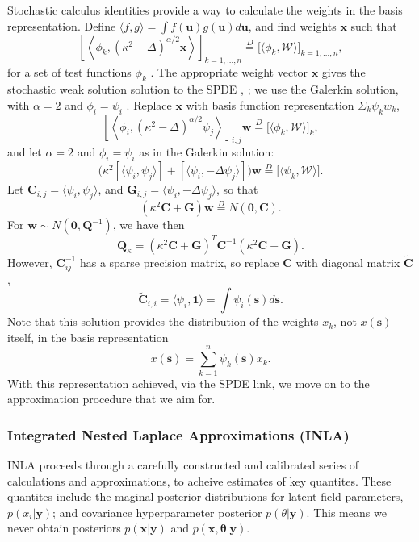 Stochastic calculus identities provide a way to calculate the weights in the basis representation. Define $\langle f, g \rangle = \int f(\pmb{u}) g(\pmb{u}) d\pmb{u}$, and find weights $\pmb{x}$ such that
$$ \left[ \left< \phi_{k}, (\kappa^{2} - \Delta)^{\alpha/2} \pmb{x} \right> \right]_{k = 1, \hdots, n} \overset{D}{=} \Big[ \langle \phi_{k}, \mathcal{W} \rangle \Big]_{k = 1, \hdots, n},$$
for a set of test functions $\phi_{k}$ \citep{Lindgren2011}. The appropriate weight vector $\pmb{x}$ gives the stochastic weak solution solution to the SPDE \citep{Mao2007}, \cite{Lindstrom2014}; we use the Galerkin solution, with $\alpha = 2$ and $\phi_{i} = \psi_{i}$ \citep{Lindgren2011}. Replace $\pmb{x}$ with basis function representation $\Sigma_{k}\psi_{k}w_{k}$,
$$ \left[ \left< \phi_{i}, (\kappa^{2} - \Delta)^{\alpha/2} \psi_{j} \right> \right]_{i,j}\pmb{w} \overset{D}{=} \Big[ \langle \phi_{k}, \mathcal{W} \rangle \Big]_{k}, $$
and let $\alpha = 2$ and $\phi_{i} = \psi_{i}$ as in the Galerkin solution:
$$ \Big(
\kappa^{2} [ \langle \psi_{i}, \psi_{j} \rangle ] + [ \langle \psi_{i}, -\Delta \psi_{j} \rangle ]
\Big) \pmb{w} \overset{D}{=} \Big[ \langle \psi_{k}, \mathcal{W} \rangle \Big]. $$
Let $\pmb{C}_{i,j} = \langle \psi_{i}, \psi_{j} \rangle$, and $ \pmb{G}_{i,j} = \langle \psi_{i}, - \Delta \psi_{j} \rangle$, so that
$$ \left(
\kappa^{2} \pmb{C} + \pmb{G} \right) \pmb{w} \overset{D}{=} N(\pmb{0},\pmb{C}).$$
For $\pmb{w} \sim N(\pmb{0}, \pmb{Q}^{-1})$, we have then
$$\pmb{Q}_{\kappa} = \left( \kappa^{2} \pmb{C} + \pmb{G} \right)^{T} \pmb{C}^{-1} \left( \kappa^{2} \pmb{C} + \pmb{G} \right).$$ 
However, $\pmb{C}_{ij}^{-1}$ has a sparse precision matrix, so replace $\pmb{C}$ with diagonal matrix $\widetilde{\pmb{C}}$,
$$ \widetilde{\pmb{C}}_{i,i} = \langle \psi_{i}, \pmb{1} \rangle = \int \psi_{i}(\pmb{s}) d\pmb{s}.$$ 
Note that this solution provides the distribution of the weights $x_{k}$, not $x(\pmb{s})$ itself, in the basis representation
$$ x(\pmb{s}) = \sum_{k=1}^{n} \psi_{k}(\pmb{s})x_{k}.$$
With this representation achieved, via the SPDE link, we move on to the approximation procedure that we aim for.

\subsubsection{Integrated Nested Laplace Approximations (INLA)}

INLA proceeds through a carefully constructed and calibrated series of calculations and approximations, to acheive estimates of key quantites. These quantites include the maginal posterior distributions for latent field parameters, $p(x_{i}|\pmb{y})$; and covariance hyperparameter posterior $p(\theta|\pmb{y})$. This means we never obtain posteriors $p(\pmb{x}|\pmb{y})$ and $p(\pmb{x},\pmb{\theta}|\pmb{y})$. 

